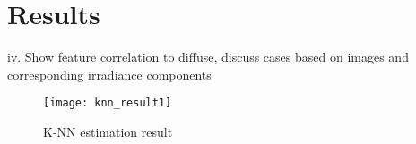 \chapter{Results}
iv.	Show feature correlation to diffuse, discuss cases based on images and corresponding irradiance components


\begin{figure}[h]
\caption{K-NN estimation result}
\label{fig:knn_result1}
\texttt{[image: knn\_result1]}
\centering
\end{figure}
